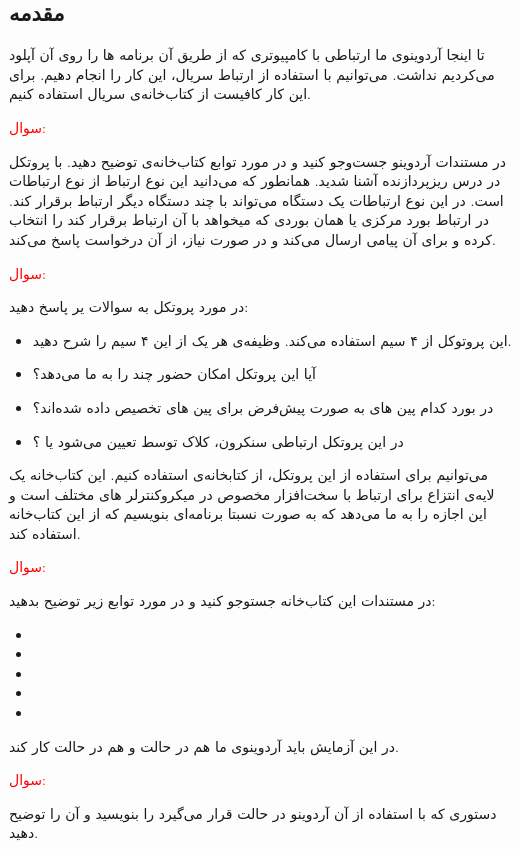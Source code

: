 \subsection{مقدمه}
تا اینجا آردوینوی ما ارتباطی با کامپیوتری که از طریق آن برنامه ها را روی آن آپلود می‌کردیم نداشت. می‌توانیم با استفاده از ارتباط سریال، این کار را انجام دهیم. برای این کار کافیست از کتاب‌خانه‌ی سریال استفاده کنیم.
\newline
\textcolor{red}{\begin{nas}سوال: \end{nas}}
در مستندات آردوینو جست‌و‌جو کنید و در مورد توابع کتاب‌خانه‌ی  توضیح دهید.
\newline
با پروتکل  در درس ریزپردازنده آشنا شدید.
همانطور که می‌دانید این نوع ارتباط از نوع ارتباطات  است. در این نوع ارتباطات یک دستگاه می‌تواند با چند دستگاه دیگر ارتباط برقرار کند. در ارتباط  بورد مرکزی یا همان  بوردی که میخواهد با آن ارتباط برقرار کند را انتخاب کرده و برای آن پیامی ارسال می‌کند و در صورت نیاز، از آن درخواست پاسخ می‌کند.
\newline
\textcolor{red}{\begin{nas}سوال: \end{nas}}
در مورد پروتکل  به سوالات یر پاسخ دهید:
\begin{itemize}
    \item این پروتوکل از ۴ سیم استفاده می‌کند. وظیفه‌ی هر یک از این ۴ سیم را شرح دهید.
    \item آیا این پروتکل امکان حضور چند  را به ما می‌دهد؟
    \item در بورد  کدام پین های به صورت پیش‌فرض برای پین های  تخصیص داده شده‌اند؟
    \item در این پروتکل ارتباطی سنکرون، کلاک توسط  تعیین می‌شود یا ؟
\end{itemize}
\newline
می‌توانیم برای استفاده از این پروتکل، از کتابخانه‌ی  استفاده کنیم. این کتاب‌خانه یک لایه‌ی انتزاع برای ارتباط با سخت‌افزار مخصوص  در میکروکنترلر های مختلف است و این اجازه را به ما می‌دهد که به صورت نسبتا  برنامه‌ای بنویسیم که از این کتاب‌خانه استفاده کند.
\newline
\textcolor{red}{\begin{nas}سوال: \end{nas}}
در مستندات این کتاب‌خانه جستوجو کنید و در مورد توابع زیر توضیح بدهید:
\begin{itemize}
    \item {}
    \item {}
    \item {}
    \item {}
    \item {}
\end{itemize}
در این آزمایش باید آردوینوی ما هم در حالت  و هم در حالت  کار کند.
\newline
\textcolor{red}{\begin{nas}سوال: \end{nas}}
دستوری که با استفاده از آن آردوینو در حالت  قرار می‌گیرد را بنویسید و آن را توضیح دهید.

